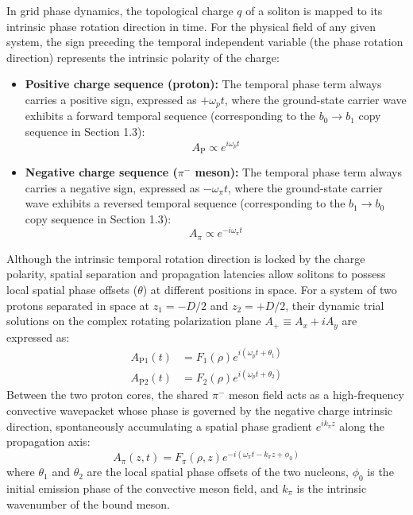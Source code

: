 \documentclass[12pt, a4paper]{article}
\begin{document}
In grid phase dynamics, the topological charge $q$ of a soliton is mapped to its intrinsic phase rotation direction in time. For the physical field of any given system, the sign preceding the temporal independent variable (the phase rotation direction) represents the intrinsic polarity of the charge:
\begin{itemize}
    \item \textbf{Positive charge sequence (proton):} The temporal phase term always carries a positive sign, expressed as $+\omega_p t$, where the ground-state carrier wave exhibits a forward temporal sequence (corresponding to the $b_0 \to b_1$ copy sequence in Section 1.3):
    \begin{equation}
    A_{\mathrm{P}} \propto e^{i\omega_p t}
    \end{equation}
    \item \textbf{Negative charge sequence ($\pi^-$ meson):} The temporal phase term always carries a negative sign, expressed as $-\omega_\pi t$, where the ground-state carrier wave exhibits a reversed temporal sequence (corresponding to the $b_1 \to b_0$ copy sequence in Section 1.3):
    \begin{equation}
    A_{\pi} \propto e^{-i\omega_\pi t}
    \end{equation}
\end{itemize}
Although the intrinsic temporal rotation direction is locked by the charge polarity, spatial separation and propagation latencies allow solitons to possess local spatial phase offsets ($\theta$) at different positions in space. For a system of two protons separated in space at $z_1 = -D/2$ and $z_2 = +D/2$, their dynamic trial solutions on the complex rotating polarization plane $A_+ \equiv A_x + i A_y$ are expressed as:
\begin{align}
A_{\mathrm{P1}}(t) &= F_1(\rho) e^{i(\omega_p t + \theta_1)} \\
A_{\mathrm{P2}}(t) &= F_2(\rho) e^{i(\omega_p t + \theta_2)}
\end{align}
Between the two proton cores, the shared $\pi^-$ meson field acts as a high-frequency convective wavepacket whose phase is governed by the negative charge intrinsic direction, spontaneously accumulating a spatial phase gradient $e^{i k_\pi z}$ along the propagation axis:
\begin{equation}
A_\pi(z, t) = F_\pi(\rho, z) e^{-i(\omega_\pi t - k_\pi z + \phi_0)}
\end{equation}
where $\theta_1$ and $\theta_2$ are the local spatial phase offsets of the two nucleons, $\phi_0$ is the initial emission phase of the convective meson field, and $k_\pi$ is the intrinsic wavenumber of the bound meson.
\end{document}
